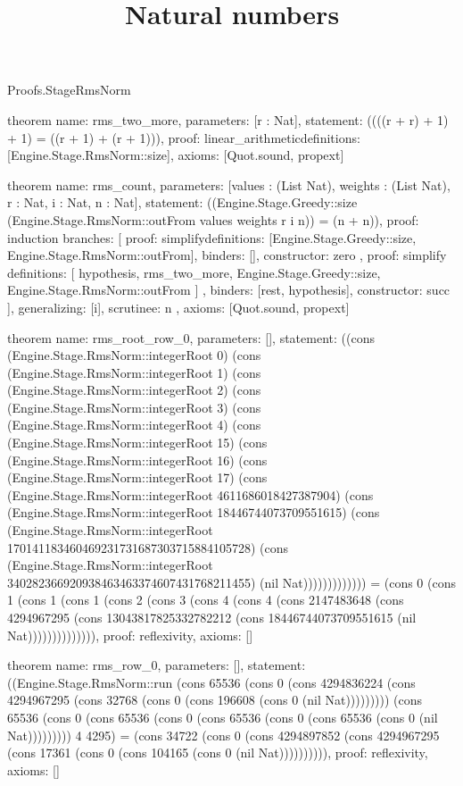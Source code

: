 \begin{lexlean}{Proofs.StageRmsNorm}
\title{Natural numbers}
\begin{semanticmodule}
theorem{
  name: rms_two_more,
  parameters: [r : Nat],
  statement: ((((r + r) + 1) + 1) = ((r + 1) + (r + 1))),
  proof: linear_arithmetic{definitions: [Engine.Stage.RmsNorm::size]},
  axioms: [Quot.sound, propext]
}

theorem{
  name: rms_count,
  parameters: [values : (List Nat), weights : (List Nat), r : Nat, i : Nat, n : Nat],
  statement: ((Engine.Stage.Greedy::size (Engine.Stage.RmsNorm::outFrom values weights r i n)) = (n + n)),
  proof: induction{
    branches: [
      {
        proof: simplify{definitions: [Engine.Stage.Greedy::size, Engine.Stage.RmsNorm::outFrom]},
        binders: [],
        constructor: zero
      },
      {
        proof: simplify{
          definitions: [
            hypothesis,
            rms_two_more,
            Engine.Stage.Greedy::size,
            Engine.Stage.RmsNorm::outFrom
          ]
        },
        binders: [rest, hypothesis],
        constructor: succ
      }
    ],
    generalizing: [i],
    scrutinee: n
  },
  axioms: [Quot.sound, propext]
}

theorem{
  name: rms_root_row_0,
  parameters: [],
  statement: ((cons (Engine.Stage.RmsNorm::integerRoot 0) (cons (Engine.Stage.RmsNorm::integerRoot 1) (cons (Engine.Stage.RmsNorm::integerRoot 2) (cons (Engine.Stage.RmsNorm::integerRoot 3) (cons (Engine.Stage.RmsNorm::integerRoot 4) (cons (Engine.Stage.RmsNorm::integerRoot 15) (cons (Engine.Stage.RmsNorm::integerRoot 16) (cons (Engine.Stage.RmsNorm::integerRoot 17) (cons (Engine.Stage.RmsNorm::integerRoot 4611686018427387904) (cons (Engine.Stage.RmsNorm::integerRoot 18446744073709551615) (cons (Engine.Stage.RmsNorm::integerRoot 170141183460469231731687303715884105728) (cons (Engine.Stage.RmsNorm::integerRoot 340282366920938463463374607431768211455) (nil Nat))))))))))))) = (cons 0 (cons 1 (cons 1 (cons 1 (cons 2 (cons 3 (cons 4 (cons 4 (cons 2147483648 (cons 4294967295 (cons 13043817825332782212 (cons 18446744073709551615 (nil Nat)))))))))))))),
  proof: reflexivity{},
  axioms: []
}

theorem{
  name: rms_row_0,
  parameters: [],
  statement: ((Engine.Stage.RmsNorm::run (cons 65536 (cons 0 (cons 4294836224 (cons 4294967295 (cons 32768 (cons 0 (cons 196608 (cons 0 (nil Nat))))))))) (cons 65536 (cons 0 (cons 65536 (cons 0 (cons 65536 (cons 0 (cons 65536 (cons 0 (nil Nat))))))))) 4 4295) = (cons 34722 (cons 0 (cons 4294897852 (cons 4294967295 (cons 17361 (cons 0 (cons 104165 (cons 0 (nil Nat)))))))))),
  proof: reflexivity{},
  axioms: []
}


\end{semanticmodule}
\end{lexlean}
